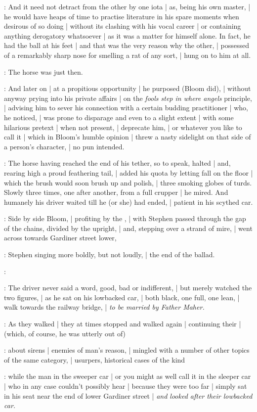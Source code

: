 :
And it need not detract from the other by one iota |
as, being his own master, |
he would have heaps of time to practise literature in his spare moments when desirous of so doing |
without its clashing with his vocal career |
or containing anything derogatory whatsoever |
as it was a matter for himself alone.
In fact, he had the ball at his feet |
and that was the very reason why the other, |
possessed of a remarkably sharp nose for smelling a rat of any sort, |
hung on to him at all.

:
The horse was just then.

:
And later on |
at a propitious opportunity |
he purposed (Bloom did), |
without anyway prying into his private affairs |
on the \emph{fools step in where angels} principle, |
advising him to sever his connection with a certain budding practitioner |
who, he noticed, |
was prone to disparage and even to a slight extent |
with some hilarious pretext |
when not present, |
deprecate him, |
or whatever you like to call it |
which in Bloom's humble opinion |
threw a nasty sidelight on that side of a person's character, |
no pun intended.

:
The horse having reached the end of his tether, so to speak, halted |
and, rearing high a proud feathering tail, |
added his quota by letting fall on the floor |
which the brush would soon brush up and polish, |
three smoking globes of turds.
Slowly three times, one after another, from a full crupper |
he mired.
And humanely his driver waited till he (or she) had ended, |
patient in his scythed car.

:
Side by side Bloom, |
profiting by the , |
with Stephen passed through the gap of the chains, divided by the upright, |
and, stepping over a strand of mire, |
went across towards Gardiner street lower,

:
Stephen singing more boldly, but not loudly, |
the end of the ballad.

\Stephen:
\begin{verse}
\end{verse}

:
The driver never said a word, good, bad or indifferent, |
but merely watched the two figures, |
as he sat on his lowbacked car, |
both black, one full, one lean, |
walk towards the railway bridge, |
\emph{to be married by Father Maher.}

:
As they walked |
they at times stopped and walked again |
continuing their  |
(which, of course, he was utterly out of)

:
about sirens |
enemies of man's reason, |
mingled with a number of other topics of the same category, |
usurpers, historical cases of the kind

:
while the man in the sweeper car |
or you might as well call it in the sleeper car |
who in any case couldn't possibly hear |
because they were too far |
simply sat in his seat near the end of lower Gardiner street |
\emph{and looked after their lowbacked car.}


